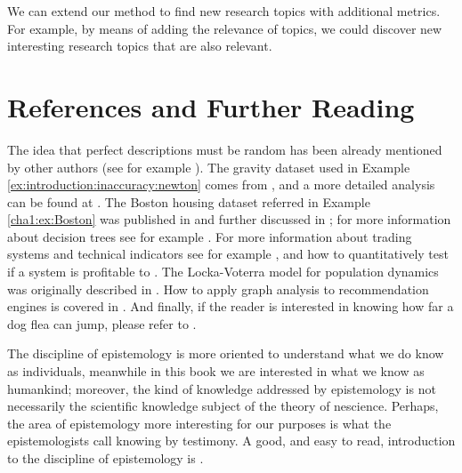 We can extend our method to find new research topics with additional metrics. For example, by means of adding the relevance of topics, we could discover new interesting research topics that are also relevant.

%
%

\section{References and Further Reading}

The idea that perfect descriptions must be random has been already mentioned by other authors (see for example \cite{mosterin2016conceptos}). The gravity dataset used in Example \ref{ex:introduction:inaccuracy:newton} comes from \cite{cressie1982playing}, and a more detailed analysis can be found at \cite{davison1997bootstrap}. The Boston housing dataset referred in Example \ref{cha1:ex:Boston} was published in \cite{harrison1978hedonic} and further discussed in \cite{belsley2005regression}; for more information about decision trees see for example \cite{james2013introduction}. For more information about trading systems and technical indicators see for example \cite{kaufman2013trading}, and how to quantitatively test if a system is profitable to \cite{pardo1992design}. The Locka-Voterra model for population dynamics was originally described in \cite{lotka1920analytical}. How to apply graph analysis to recommendation engines is covered in \cite{cordobes2015empirical}. And finally, if the reader is interested in knowing how far a dog flea can jump, please refer to \cite{cadiergues2000comparison}.

The discipline of epistemology is more oriented to understand what we do know as individuals, meanwhile in this book we are interested in what we know as humankind; moreover, the kind of knowledge addressed by epistemology is not necessarily the scientific knowledge subject of the theory of nescience. Perhaps, the area of epistemology more interesting for our purposes is what the epistemologists call knowing by testimony. A good, and easy to read, introduction to the discipline of epistemology is \cite{nagel2014knowledge}.




